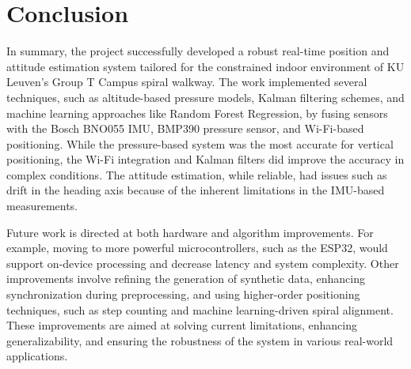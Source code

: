 \chapter{Conclusion}
In summary, the project successfully developed a robust real-time position and attitude estimation system tailored for the constrained indoor environment of KU Leuven's Group T Campus spiral walkway. The work implemented several techniques, such as altitude-based pressure models, Kalman filtering schemes, and machine learning approaches like Random Forest Regression, by fusing sensors with the Bosch BNO055 IMU, BMP390 pressure sensor, and Wi-Fi-based positioning. While the pressure-based system was the most accurate for vertical positioning, the Wi-Fi integration and Kalman filters did improve the accuracy in complex conditions. The attitude estimation, while reliable, had issues such as drift in the heading axis because of the inherent limitations in the IMU-based measurements.
 
Future work is directed at both hardware and algorithm improvements. For example, moving to more powerful microcontrollers, such as the ESP32, would support on-device processing and decrease latency and system complexity. Other improvements involve refining the generation of synthetic data, enhancing synchronization during preprocessing, and using higher-order positioning techniques, such as step counting and machine learning-driven spiral alignment. These improvements are aimed at solving current limitations, enhancing generalizability, and ensuring the robustness of the system in various real-world applications.
